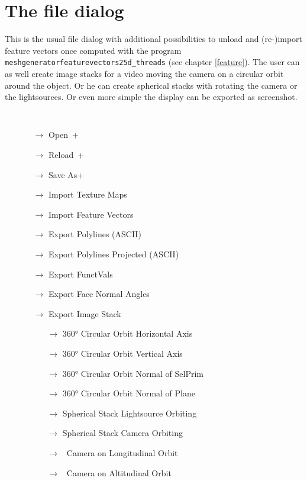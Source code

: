 
\section{The file dialog}\label{file}
This is the usual file dialog with additional possibilities to unload and (re-)import feature vectors once computed with the program {\tt meshgeneratorfeaturevectors25d\_threads} (see chapter \ref{feature}). The user can as well create image stacks for a video moving the camera on a circular orbit around the object. Or he can create spherical stacks with rotating the camera or the lightsources. Or even more simple the display can be exported as screenshot.
{\tt
\begin{itemize}
\item[] 
 \begin{itemize}
 \item[$\rightarrow$] Open\qquad\ \Ctrl+
 \item[$\rightarrow$] Reload\quad\ \Ctrl+
 \item[$\rightarrow$] Save As\quad \Ctrl+
 \item[$\rightarrow$] Import Texture Maps
 \item[$\rightarrow$] Import Feature Vectors
 \color{gray}
 \item[$\rightarrow$] Export Polylines (ASCII)
 \item[$\rightarrow$] Export Polylines Projected (ASCII) 
 \color{black}
 \item[$\rightarrow$] Export FunctVals
 \item[$\rightarrow$] Export Face Normal Angles
 \item[$\rightarrow$] Export Image Stack 
  \begin{itemize}
  \item[$\rightarrow$] 360° Circular Orbit Horizontal Axis
  \item[$\rightarrow$] 360° Circular Orbit Vertical Axis
  \item[$\rightarrow$] 360° Circular Orbit Normal of SelPrim
  \item[$\rightarrow$] 360° Circular Orbit Normal of Plane
  \item[$\rightarrow$] Spherical Stack Lightsource Orbiting
  \item[$\rightarrow$] Spherical Stack Camera Orbiting
  \item[$\rightarrow$] \textbullet\ Camera on Longitudinal Orbit
  \item[$\rightarrow$] \textopenbullet\ Camera on  Altitudinal Orbit

\end{itemize}
\end{itemize}
\end{itemize}}
